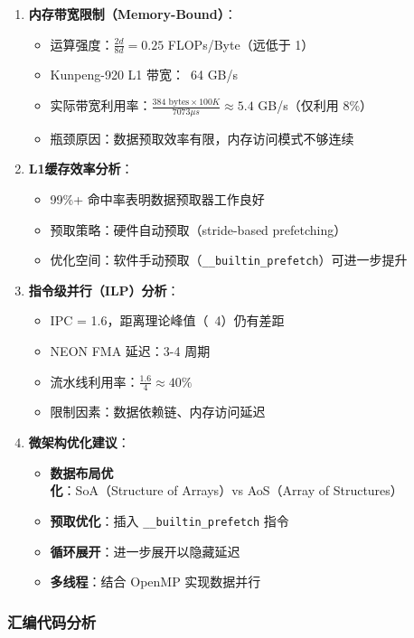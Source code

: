 \documentclass[a4paper]{article}
\begin{document}
\begin{enumerate}
  \item \textbf{内存带宽限制（Memory-Bound）}：
  \begin{itemize}
    \item 运算强度：$\frac{2d}{8d} = 0.25$ FLOPs/Byte（远低于 1）
    \item Kunpeng-920 L1 带宽：~64 GB/s
    \item 实际带宽利用率：$\frac{384 \text{ bytes} \times 100K}{7073 \mu s} \approx 5.4$ GB/s（仅利用 8\%）
    \item 瓶颈原因：数据预取效率有限，内存访问模式不够连续
  \end{itemize}
  
  \item \textbf{L1缓存效率分析}：
  \begin{itemize}
    \item 99\%+ 命中率表明数据预取器工作良好
    \item 预取策略：硬件自动预取（stride-based prefetching）
    \item 优化空间：软件手动预取（\texttt{\_\_builtin\_prefetch}）可进一步提升
  \end{itemize}
  
  \item \textbf{指令级并行（ILP）分析}：
  \begin{itemize}
    \item IPC = 1.6，距离理论峰值（~4）仍有差距
    \item NEON FMA 延迟：3-4 周期
    \item 流水线利用率：$\frac{1.6}{4} \approx 40\%$
    \item 限制因素：数据依赖链、内存访问延迟
  \end{itemize}
  
  \item \textbf{微架构优化建议}：
  \begin{itemize}
    \item \textbf{数据布局优化}：SoA（Structure of Arrays）vs AoS（Array of Structures）
    \item \textbf{预取优化}：插入 \texttt{\_\_builtin\_prefetch} 指令
    \item \textbf{循环展开}：进一步展开以隐藏延迟
    \item \textbf{多线程}：结合 OpenMP 实现数据并行
  \end{itemize}
\end{enumerate}

\subsubsection{汇编代码分析}
\end{document}
